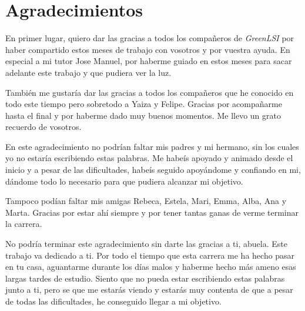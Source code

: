 \cleardoublepage
\chapter*{Agradecimientos} %
\markboth{}{} %
 
En primer lugar, quiero dar las gracias a todos los compañeros de \textit{GreenLSI} por haber compartido estos meses de trabajo con vosotros y por vuestra ayuda. En especial a mi tutor Jose Manuel, por haberme guiado en estos meses para sacar adelante este trabajo  y que pudiera ver la luz.

También me gustaría dar las gracias a todos los compañeros que he conocido en todo este tiempo pero sobretodo a Yaiza y Felipe. Gracias por acompañarme hasta el final y por haberme dado muy buenos momentos. Me llevo un grato recuerdo de vosotros.

En este agradecimiento no podrían faltar mis padres y mi hermano, sin los cuales yo no estaría escribiendo estas palabras. Me habeís apoyado y animado desde el inicio y a pesar de las dificultades, habeís seguido apoyándome y confiando en mi, dándome todo lo necesario para que pudiera alcanzar mi objetivo.

Tampoco podían faltar mis amigas Rebeca, Estela, Mari, Emma, Alba, Ana y Marta. Gracias por estar ahí siempre y por tener tantas ganas de verme terminar la carrera. 

No podría terminar este agradecimiento sin darte las gracias a ti, abuela. Este trabajo va dedicado a ti. Por todo el tiempo que esta carrera me ha hecho pasar en tu casa, aguantarme durante los días malos y haberme hecho más ameno esas largas tardes de estudio. Siento que no pueda estar escribiendo estas palabras junto a ti, pero se que me estarás viendo y estarás muy contenta de que a pesar de todas las dificultades, he conseguido llegar a mi objetivo.

